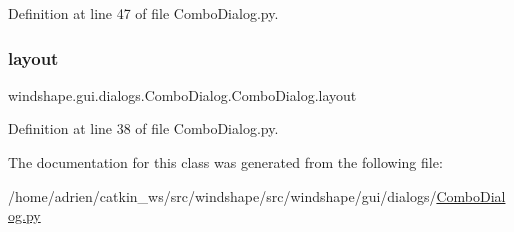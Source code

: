 Definition at line 47 of file Combo\+Dialog.\+py.

\mbox{\label{classwindshape_1_1gui_1_1dialogs_1_1_combo_dialog_1_1_combo_dialog_aefe8cb25193e84448395357dfbb64ca6}} 
\subsubsection{\texorpdfstring{layout}{layout}}
{\footnotesize\ttfamily windshape.\+gui.\+dialogs.\+Combo\+Dialog.\+Combo\+Dialog.\+layout}



Definition at line 38 of file Combo\+Dialog.\+py.



The documentation for this class was generated from the following file\+:\begin{DoxyCompactItemize}
\item 
/home/adrien/catkin\+\_\+ws/src/windshape/src/windshape/gui/dialogs/\mbox{\hyperlink{_combo_dialog_8py}{Combo\+Dialog.\+py}}\end{DoxyCompactItemize}
